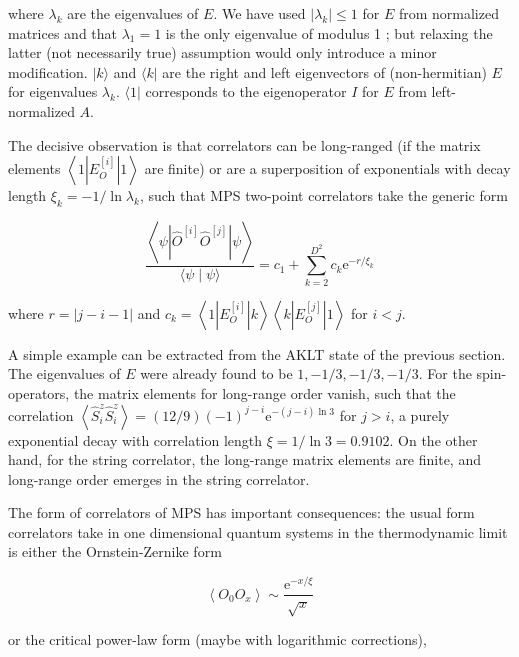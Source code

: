 \documentclass[12pt]{article}
\begin{document}
where $\lambda_{k}$ are the eigenvalues of $E$. We have used $\left|\lambda_{k}\right| \leq 1$ for $E$ from normalized matrices and that $\lambda_{1}=1$ is the only eigenvalue of modulus 1 ; but relaxing the latter (not necessarily true) assumption would only introduce a minor modification. $|k\rangle$ and $\langle k|$ are the right and left eigenvectors of (non-hermitian) $E$ for eigenvalues $\lambda_{k}$. $\langle 1|$ corresponds to the eigenoperator $I$ for $E$ from left-normalized $A$.

The decisive observation is that correlators can be long-ranged (if the matrix elements $\left\langle 1\left|E_{O}^{[i]}\right| 1\right\rangle$ are finite) or are a superposition of exponentials with decay length $\xi_{k}=-1 / \ln \lambda_{k}$, such that MPS two-point correlators take the generic form


\begin{equation*}
\frac{\left\langle\psi\left|\hat{O}^{[i]} \hat{O}^{[j]}\right| \psi\right\rangle}{\langle\psi \mid \psi\rangle}=c_{1}+\sum_{k=2}^{D^{2}} c_{k} \mathrm{e}^{-r / \xi_{k}} \tag{115}
\end{equation*}


where $r=|j-i-1|$ and $c_{k}=\left\langle 1\left|E_{O}^{[i]}\right| k\right\rangle\left\langle k\left|E_{O}^{[j]}\right| 1\right\rangle$ for $i<j$.

A simple example can be extracted from the AKLT state of the previous section. The eigenvalues of $E$ were already found to be $1,-1 / 3,-1 / 3,-1 / 3$. For the spin-operators, the matrix elements for long-range order vanish, such that the correlation $\left\langle\hat{S}_{i}^{z} \hat{S}_{i}^{z}\right\rangle=(12 / 9)(-1)^{j-i} \mathrm{e}^{-(j-i) \ln 3}$ for $j>i$, a purely exponential decay with correlation length $\xi=1 / \ln 3=0.9102$. On the other hand, for the string correlator, the long-range matrix elements are finite, and long-range order emerges in the string correlator.

The form of correlators of MPS has important consequences: the usual form correlators take in one dimensional quantum systems in the thermodynamic limit is either the Ornstein-Zernike form


\begin{equation*}
\left\langle O_{0} O_{x}\right\rangle \sim \frac{\mathrm{e}^{-x / \xi}}{\sqrt{x}} \tag{116}
\end{equation*}


or the critical power-law form (maybe with logarithmic corrections),
\end{document}
